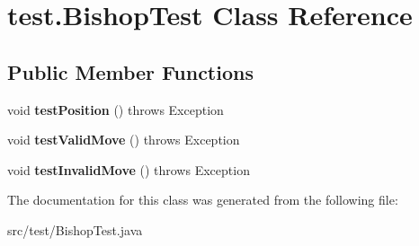 \hypertarget{classtest_1_1_bishop_test}{}\section{test.\+Bishop\+Test Class Reference}
\label{classtest_1_1_bishop_test}
\subsection*{Public Member Functions}
\begin{DoxyCompactItemize}
\item 
\mbox{\label{classtest_1_1_bishop_test_a17eecddbdfc11bde69d27d5ef42462c6}} 
void {\bfseries test\+Position} ()  throws Exception 
\item 
\mbox{\label{classtest_1_1_bishop_test_a29cbfa954c25992b79e8838c987eafb3}} 
void {\bfseries test\+Valid\+Move} ()  throws Exception 
\item 
\mbox{\label{classtest_1_1_bishop_test_a8fdf33a4359a7403b6a43810326da7ae}} 
void {\bfseries test\+Invalid\+Move} ()  throws Exception 
\end{DoxyCompactItemize}


The documentation for this class was generated from the following file\+:\begin{DoxyCompactItemize}
\item 
src/test/Bishop\+Test.\+java\end{DoxyCompactItemize}
